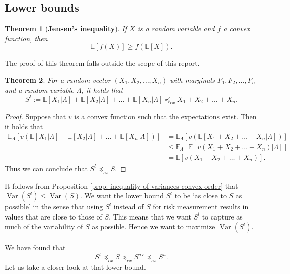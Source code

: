 \documentclass{article}
\newtheorem{theorem}{Theorem}
\DeclareMathOperator{\Var}{Var}
\begin{document}
\subsection{Lower bounds}\label{subsection: lower bounds}

\begin{theorem}[\textbf{Jensen's inequality}]\cite[Theorem 1.6.1]{Risk_Measurement}
    If $X$ is a random variable and $f$ a convex function, then
    $$\mathbb{E}[f(X)]\geq f(\mathbb{E}[X]).$$
\end{theorem}

The proof of this theorem falls outside the scope of this report.
\begin{theorem}\cite[Proposition 3]{kaas-2000}\label{prop: lower bound}
    For a random vector $(X_1,X_2,\dots,X_n)$ with marginals $F_1,F_2,\dots,F_n$ and a random variable $\Lambda$, it holds that
    $$S^l := \mathbb{E}[X_1| \Lambda] + \mathbb{E}[X_2| \Lambda] + \dots + \mathbb{E}[X_n|\Lambda] \preceq_{cx} X_1 + X_2 + \dots + X_n.$$
\end{theorem}
\begin{proof}
    Suppose that $v$ is a convex function such that the expectations exist. Then it holds that 
    \begin{align*}
        \mathbb{E}_\Lambda\left[v\left( \mathbb{E}[X_1| \Lambda] + \mathbb{E}[X_2| \Lambda] + \dots + \mathbb{E}[X_n|\Lambda]\right)\right] &= \mathbb{E}_\Lambda\left[v\left( \mathbb{E}[X_1 + X_2 + \dots + X_n|\Lambda]\right)\right]\\
        &\leq \mathbb{E}_\Lambda\left[ \mathbb{E}[v\left(X_1 + X_2 + \dots + X_n\right)|\Lambda]\right]\\
        &=  \mathbb{E}[v\left(X_1 + X_2 + \dots + X_n\right)].
    \end{align*}
    Thus we can conclude that $S^l  \preceq_{cx} S$.
\end{proof}
It follows from Proposition \ref{prop: inequality of variances convex order} that $\Var\left(S^l\right) \leq \Var(S)$. We want the lower bound $S^l$ to be `as close to $S$ as possible' in the sense that using $S^l$ instead of $S$ for risk measurement results in values that are close to those of $S$. This means that we want $S^l$ to capture as much of the variability of $S$ as possible. Hence we want to maximize $\Var\left(S^l\right)$.\\\\
We have found that
$$S^l \preceq_{cx} S \preceq_{cx} {S^u}' \preceq_{cx}S^u.$$
Let us take a closer look at that lower bound. 
\end{document}
